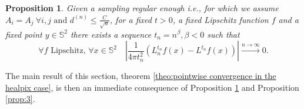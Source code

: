 \documentclass{article} %
\newtheorem{prop}{Proposition}
\begin{document}
\vspace{0.5cm}
\begin{prop}\label{prop:2}
	Given a sampling regular enough i.e., for which we assume $A_i=A_j \ \forall i,j\text{ and }d^{(n)}\leq \frac{C}{\sqrt{n}}$, for a fixed $t>0$, a fixed Lipschitz function $f$ and a fixed point $y\in\mathbb S^2$ there exists a sequence $t_n = n^\beta, \beta<0$ such that 
$$
\forall f \text{ Lipschitz, } \forall x\in\mathbb S^2 \quad \left|\frac{1}{4\pi t_n^2}\left(L_n^{t_n}f(x) - L^{t_n}f(x)\right)\right|\xrightarrow{n\to \infty}0.
$$
\end{prop}
\vspace{0.5cm}

The main result of this section, theorem  \ref{theo:pointwise convergence in the healpix case}, is then an immediate consequence of Proposition \ref{prop:2} and Proposition \ref{prop:3}.
\end{document}

